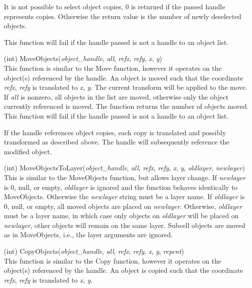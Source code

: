 \begin{description}
It is not possible to select object copies, 0 is returned if the
passed handle represents copies.  Otherwise the return value is the
number of newly deselected objects.

This function will fail if the handle passed is not a handle to an
object list.

\item{(int) \vt MoveObjects({\it object\_handle}, {\it all\/}, {\it refx},
 {\it refy}, {\it x}, {\it y})}\\
This function is similar to the {\vt Move} function, however it
operates on the object(s) referenced by the handle.  An object is
moved such that the coordinate {\it refx}, {\it refy} is translated to
{\it x}, {\it y}.  The current transform will be applied to the move. 
If {\it all} is nonzero, all objects in the list are moved, otherwise
only the object currently referenced is moved.  The function returns
the number of objects moved.  This function will fail if the handle
passed is not a handle to an object list.

If the handle references object copies, each copy is translated and
possibly transformed as described above.  The handle will subsequently
reference the modified object.

\item{(int) \vt MoveObjectsToLayer({\it object\_handle}, {\it all\/},
 {\it refx\/}, {\it refy\/}, {\it x\/}, {\it y\/}, {\it oldlayer\/},
 {\it newlayer\/})}\\
This is similar to the {\vt MoveObjects} function, but allows layer
change.  If {\it newlayer} is 0, null, or empty, {\it oldlayer} is
ignored and the function behaves identically to {\vt MoveObjects}. 
Otherwise the {\it newlayer} string must be a layer name.  If {\it
oldlayer} is 0, null, or empty, all moved objects are placed on {\it
newlayer\/}.  Otherwise, {\it oldlayer} must be a layer name, in which
case only objects on {\it oldlayer} will be placed on {\it
newlayer\/}, other objects will remain on the same layer.  Subcell
objects are moved as in {\vt MoveObjects}, i.e., the layer arguments
are ignored.

\item{(int) \vt CopyObjects({\it object\_handle}, {\it all\/}, {\it refx},
 {\it refy}, {\it x}, {\it y}, {\it repcnt\/})}\\
This function is similar to the {\vt Copy} function, however it
operates on the object(s) referenced by the handle.  An object is
copied such that the coordinate {\it refx}, {\it refy} is translated
to {\it x}, {\it y}.


\end{description}
